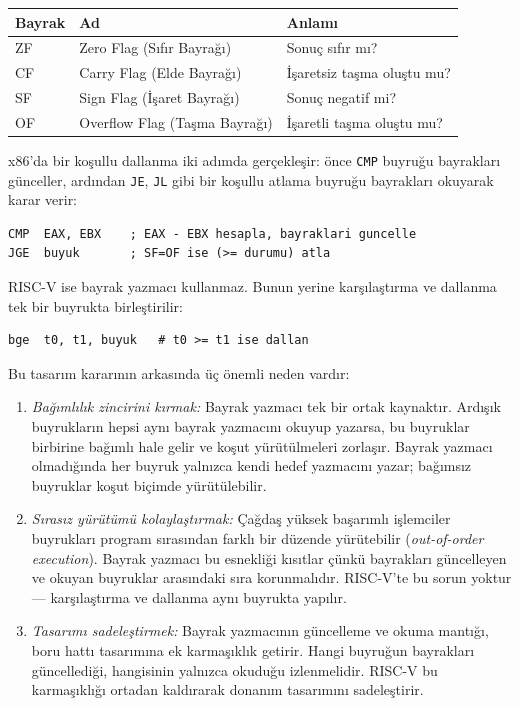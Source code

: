 \begin{center}
\small
\begin{tabular}{lll}
\toprule
Bayrak & Ad & Anlamı \\
\midrule
ZF & Zero Flag (Sıfır Bayrağı) & Sonuç sıfır mı? \\
CF & Carry Flag (Elde Bayrağı) & İşaretsiz taşma oluştu mu? \\
SF & Sign Flag (İşaret Bayrağı) & Sonuç negatif mi? \\
OF & Overflow Flag (Taşma Bayrağı) & İşaretli taşma oluştu mu? \\
\bottomrule
\end{tabular}
\end{center}

x86'da bir koşullu dallanma iki adımda gerçekleşir: önce \texttt{CMP} buyruğu bayrakları günceller, ardından \texttt{JE}, \texttt{JL} gibi bir koşullu atlama buyruğu bayrakları okuyarak karar verir:

\begin{lstlisting}[language={[x86masm]Assembler}, style=alistirma-kod]
CMP  EAX, EBX    ; EAX - EBX hesapla, bayraklari guncelle
JGE  buyuk       ; SF=OF ise (>= durumu) atla
\end{lstlisting}

RISC-V ise bayrak yazmacı kullanmaz. Bunun yerine karşılaştırma ve dallanma tek bir buyrukta birleştirilir:

\begin{lstlisting}[style=riscv]
bge  t0, t1, buyuk   # t0 >= t1 ise dallan
\end{lstlisting}

Bu tasarım kararının arkasında üç önemli neden vardır:

\begin{enumerate}
\item \emph{Bağımlılık zincirini kırmak:} Bayrak yazmacı tek bir ortak kaynaktır. Ardışık buyrukların hepsi aynı bayrak yazmacını okuyup yazarsa, bu buyruklar birbirine bağımlı hale gelir ve koşut yürütülmeleri zorlaşır. Bayrak yazmacı olmadığında her buyruk yalnızca kendi hedef yazmacını yazar; bağımsız buyruklar koşut biçimde yürütülebilir.

\item \emph{Sırasız yürütümü kolaylaştırmak:} Çağdaş yüksek başarımlı işlemciler buyrukları program sırasından farklı bir düzende yürütebilir (\emph{out-of-order execution}). Bayrak yazmacı bu esnekliği kısıtlar çünkü bayrakları güncelleyen ve okuyan buyruklar arasındaki sıra korunmalıdır. RISC-V'te bu sorun yoktur --- karşılaştırma ve dallanma aynı buyrukta yapılır.

\item \emph{Tasarımı sadeleştirmek:} Bayrak yazmacının güncelleme ve okuma mantığı, boru hattı tasarımına ek karmaşıklık getirir. Hangi buyruğun bayrakları güncellediği, hangisinin yalnızca okuduğu izlenmelidir. RISC-V bu karmaşıklığı ortadan kaldırarak donanım tasarımını sadeleştirir.
\end{enumerate}


